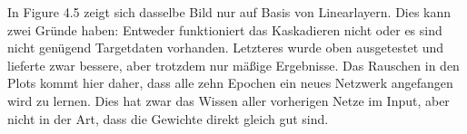 In Figure 4.5 zeigt sich dasselbe Bild nur auf Basis von Linearlayern. Dies kann zwei Gründe haben: Entweder funktioniert das Kaskadieren nicht 
oder es sind nicht genügend Targetdaten vorhanden. Letzteres wurde oben ausgetestet und lieferte zwar bessere, aber trotzdem nur mäßige Ergebnisse. 
Das Rauschen in den Plots kommt hier daher, dass alle zehn Epochen ein neues Netzwerk angefangen wird zu lernen. Dies hat zwar das Wissen aller 
vorherigen Netze im Input, aber nicht in der Art, dass die Gewichte direkt gleich gut sind. 
